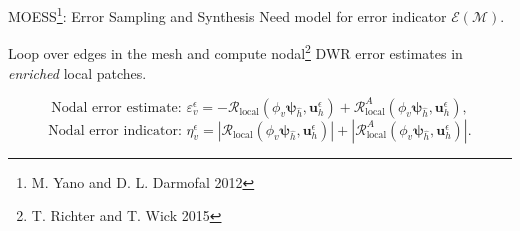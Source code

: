 \documentclass{beamer}
\newcounter{sectionframecount}
\begin{document}
\begin{frame}[t]{MOESS\footnote{M. Yano and D. L. Darmofal 2012}: Error Sampling and Synthesis}
\vspace{-12pt}
Need model for error indicator $\mathcal{E}(\mathcal{M})$.

Loop over edges in the mesh and compute nodal\footnote{T. Richter and T. Wick 2015} DWR error estimates in \textit{enriched} local patches.


\vspace{3.1cm}
\begin{equation}
  \text{Nodal error estimate: }\varepsilon_v^\epsilon = -\mathcal{R}_\text{local}(\phi_v \boldsymbol{\psi}_{\hat{h}},\boldsymbol{u}_h^\epsilon) + \mathcal{R}_\text{local}^A(\phi_v\boldsymbol{\psi}_{\hat{h}},\boldsymbol{u}^\epsilon_h),
  \label{e:dwr_est_base_local}
\end{equation}
\vspace{-10pt}
\begin{equation}
  \text{Nodal error indicator: }\eta_v^\epsilon = |\mathcal{R}_\text{local}(\phi_v \boldsymbol{\psi}_{\hat{h}},\boldsymbol{u}_h^\epsilon)| + |\mathcal{R}_\text{local}^A(\phi_v\boldsymbol{\psi}_{\hat{h}},\boldsymbol{u}^\epsilon_h)|.
  \label{e:dwr_ind_base_local}
\end{equation}

\end{frame}


\end{document}
